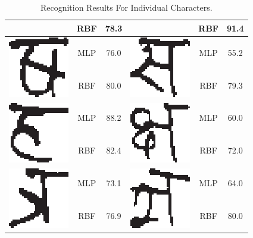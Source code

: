 \begin{table}[h]
\begin{tabular}{|c|c|c|c|c|c|}
\cline{2-3} \cline{5-6}
 & RBF & 78.3 &  & RBF & 91.4\tabularnewline
\hline
\multirow{2}{*}{\includegraphics[scale=0.25]{figures/datasets/nhcr/consonants/31khasa}} & MLP & 76.0 & \multirow{2}{*}{\includegraphics[scale=0.25]{figures/datasets/nhcr/consonants/32saa}} & MLP & 55.2\tabularnewline
\cline{2-3} \cline{5-6}
 & RBF & 80.0 &  & RBF & 79.3\tabularnewline
\hline
\multirow{2}{*}{\includegraphics[scale=0.25]{figures/datasets/nhcr/consonants/33ha}} & MLP & 88.2 & \multirow{2}{*}{\includegraphics[scale=0.25]{figures/datasets/nhcr/consonants/34kchya}} & MLP & 60.0\tabularnewline
\cline{2-3} \cline{5-6}
 & RBF & 82.4 &  & RBF & 72.0\tabularnewline
\hline
\multirow{2}{*}{\includegraphics[scale=0.25]{figures/datasets/nhcr/consonants/35tra}} & MLP & 73.1 & \multirow{2}{*}{\includegraphics[scale=0.25]{figures/datasets/nhcr/consonants/36gya}} & MLP & 64.0\tabularnewline
\cline{2-3} \cline{5-6}
 & RBF & 76.9 &  & RBF & 80.0\tabularnewline
\hline
\end{tabular}
\caption{Recognition Results For Individual Characters.}
\label{table_recognition_result_for_individual_consonants}
\end{table}

